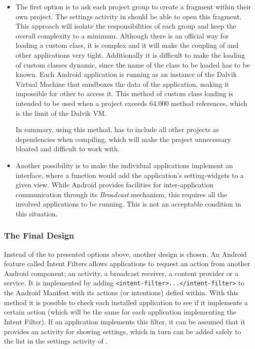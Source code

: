 \begin{itemize}
\item 
The first option is to ask each project group to create a fragment within their own project. 
The settings activity in \launcher should be able to open this fragment.
This approach will isolate the responsibilities of each group and keep the overall complexity to a minimum.
Although there is an official way for loading a custom class\cite{customClassLoading}, it is complex and it will make the coupling of \launcher and other applications very tight.
Additionally it is difficult to make the loading of custom classes dynamic, since the name of the class to be loaded has to be known.
Each Android application is running as an instance of the Dalvik Virtual Machine that sandboxes the data of the application, making it impossible for other to access it.
This method of custom class loading is intended to be used when a project exceeds 64.000 method references, which is the limit of the Dalvik VM.

In summary, using this method, \launcher has to include all other projects as dependencies when compiling, which will make the \launcher project unnecessary bloated and difficult to work with.

\item
Another possibility is to make the individual applications implement an interface, where a function would add the application's setting-widgets to a given view.
While Android provides facilities for inter-application communication through its \textit{Broadcast} mechanism\cite{broadcastReceiver}, this requires all the involved applications to be running.
This is not an acceptable condition in this situation. 
\end{itemize}
 
\subsubsection{The Final Design}
Instead of the to presented options above, another design is chosen.
An Android feature called Intent Filters allows applications to request an action from another Android component; an activity, a broadcast receiver, a content provider or a service.
It is implemented by adding \lstinline|<intent-filter>...</intent-filter>| to the Android Manifest with its actions (or intentions) defied within.\cite{intentFilter}
With this method it is possible to check each installed application to see if it implements a certain action (which will be the same for each \giraf application implementing the Intent Filter).
If an application implements this filter, it can be assumed that it provides an activity for showing settings, which in turn can be added safely to the list in the settings activity of \launcher.

